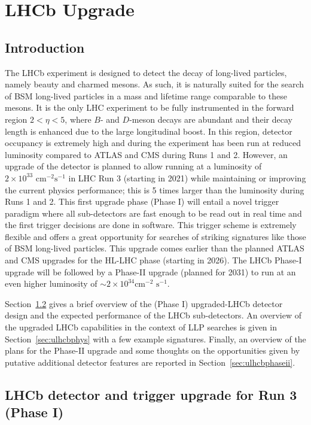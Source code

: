 \section{LHCb Upgrade}\label{sec:LHCb_upgrade}
\subsection{Introduction}

The LHCb experiment is designed to detect the decay of long-lived particles, namely beauty and charmed mesons. As such, it is naturally suited for the search of BSM long-lived particles in a mass and lifetime range comparable to these mesons. It is the only LHC experiment to be fully instrumented in the forward region $2<\eta<5$, where $B$- and $D$-meson decays are abundant and their decay length is enhanced due to the large longitudinal boost. In this region, detector occupancy is extremely high and during  the experiment has been run at reduced luminosity compared to ATLAS and CMS during Runs 1 and 2. However, an upgrade of the detector is planned to allow running at a luminosity of $2\times 10^{33}\,\,\text{cm}^{-2}\text{s}^{-1}$ in LHC Run 3 (starting in 2021) while maintaining or improving the current physics performance; this is 5 times larger than the luminosity during Runs 1 and 2. This first upgrade phase (Phase I) will entail a novel trigger paradigm where all sub-detectors are fast enough to be read out in real time and the first trigger decisions are done in software. This trigger scheme is  extremely flexible and offers a great opportunity for searches of striking signatures like those of BSM long-lived particles. This upgrade comes earlier than the planned ATLAS and CMS upgrades for the HL-LHC phase (starting in 2026). The LHCb Phase-I upgrade will be followed by a Phase-II upgrade (planned for 2031) to run at an even higher luminosity of $\sim 2\times 10^{34}\text{cm}^{-2}\,\,\text{s}^{-1}$. 

Section~\ref{sec:ulhcbperf} gives a brief overview of the (Phase I) upgraded-LHCb detector design and the expected performance of the LHCb sub-detectors. 
An overview of the upgraded LHCb capabilities in the context of LLP searches is given in Section~\ref{sec:ulhcbphys} with a few example signatures. 
Finally, an overview of the plans for the Phase-II upgrade and some thoughts on the opportunities given by putative additional detector features are reported in Section~\ref{sec:ulhcbphaseii}.



\subsection{LHCb detector and trigger upgrade for Run 3 (Phase I)}
\label{sec:ulhcbperf}

